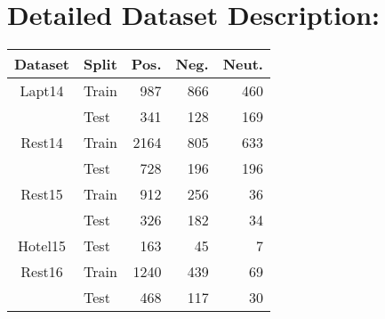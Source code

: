 \documentclass[11pt]{article}
\begin{document}
\section{Detailed Dataset Description:}
\label{sec:dataset}

\begin{table}[H]
\centering
\begin{tabular}{clrrr}
\hline
Dataset               & \multicolumn{1}{c}{Split} & \multicolumn{1}{c}{Pos.} & \multicolumn{1}{c}{Neg.} & \multicolumn{1}{c}{Neut.} \\ \hline
Lapt14               & Train          & 987        & 866               & 460                         \\
                      & Test          & 341         & 128               & 169                         \\ 
                      \hline


Rest14           & Train            & 2164         & 805              & 633                         \\
                 & Test         & 728          & 196              & 196                         \\ 
                    \hline

Rest15           & Train            & 912         & 256              & 36                         \\
                 & Test         & 326          & 182              & 34                         \\ 
                    \hline

Hotel15          & Test         & 163          & 45              & 7                         \\ 
                    \hline

Rest16           & Train            & 1240         & 439              & 69                         \\
                 & Test         & 468          & 117              & 30                         \\ 
                    \hline
\end{tabular}


\end{table}
\end{document}
